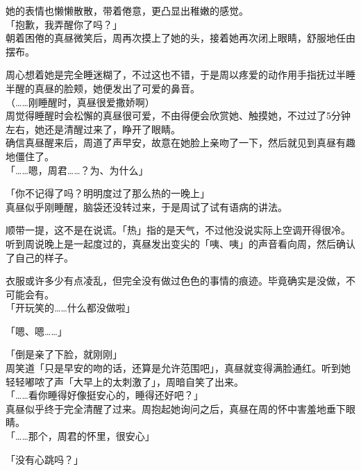她的表情也懒懒散散，带着倦意，更凸显出稚嫩的感觉。\\

「抱歉，我弄醒你了吗？」\\

朝着困倦的真昼微笑后，周再次摸上了她的头，接着她再次闭上眼睛，舒服地任由摆布。

周心想着她是完全睡迷糊了，不过这也不错，于是周以疼爱的动作用手指抚过半睡半醒的真昼的脸颊，她便发出了可爱的鼻音。\\

（……刚睡醒时，真昼很爱撒娇啊）\\

周觉得睡醒时会松懈的真昼很可爱，不由得便会欣赏她、触摸她，不过过了5分钟左右，她还是清醒过来了，睁开了眼睛。\\

确信真昼醒来后，周道了声早安，故意在她脸上亲吻了一下，然后就见到真昼有趣地僵住了。\\

「……嗯，周君……？为、为什么」

「你不记得了吗？明明度过了那么热的一晚上」\\

真昼似乎刚睡醒，脑袋还没转过来，于是周试了试有语病的讲法。

顺带一提，这不是在说谎。「热」指的是天气，不过他没说实际上空调开得很冷。\\

听到周说晚上是一起度过的，真昼发出变尖的「咦、咦」的声音看向周，然后确认了自己的样子。

衣服或许多少有点凌乱，但完全没有做过色色的事情的痕迹。毕竟确实是没做，不可能会有。\\

「开玩笑的……什么都没做啦」

「嗯、嗯……」

「倒是亲了下脸，就刚刚」\\

周笑道「只是早安的吻的话，还算是允许范围吧」，真昼就变得满脸通红。听到她轻轻嘟哝了声「大早上的太刺激了」，周暗自笑了出来。\\

「……看你睡得好像挺安心的，睡得还好吧？」\\

真昼似乎终于完全清醒了过来。周抱起她询问之后，真昼在周的怀中害羞地垂下眼睛。\\

「……那个，周君的怀里，很安心」

「没有心跳吗？」

